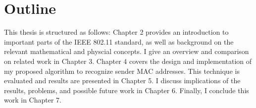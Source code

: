 
\section{Outline}

This thesis is structured as follows: Chapter 2 provides an introduction to important parts of the IEEE 802.11 standard, as well as background on the relevant mathematical and physcial concepts. I give an overview and comparison on related work in Chapter 3. Chapter 4 covers the design and implementation of my proposed algorithm to recognize sender MAC addresses. This technique is evaluated and results are presented in Chapter 5. I discuss implications of the results, problems, and possible future work in Chapter 6. Finally, I conclude this work in Chapter 7.
